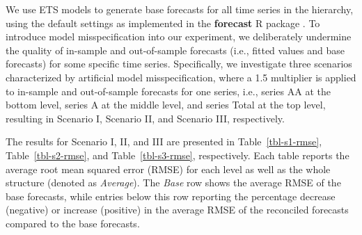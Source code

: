 \documentclass[11pt,a4paper,]{article}
\begin{document}
We use ETS models to generate base forecasts for all time series in the
hierarchy, using the default settings as implemented in the
\textbf{forecast} R package \autocite{Hyndman2023-fc}. To introduce
model misspecification into our experiment, we deliberately undermine
the quality of in-sample and out-of-sample forecasts (i.e., fitted
values and base forecasts) for some specific time series. Specifically,
we investigate three scenarios characterized by artificial model
misspecification, where a 1.5 multiplier is applied to in-sample and
out-of-sample forecasts for one series, i.e., series AA at the bottom
level, series A at the middle level, and series Total at the top level,
resulting in Scenario I, Scenario II, and Scenario III, respectively.

The results for Scenario I, II, and III are presented in
Table~\ref{tbl-s1-rmse}, Table~\ref{tbl-s2-rmse}, and
Table~\ref{tbl-s3-rmse}, respectively. Each table reports the average
root mean squared error (RMSE) for each level as well as the whole
structure (denoted as \emph{Average}). The \emph{Base} row shows the
average RMSE of the base forecasts, while entries below this row
reporting the percentage decrease (negative) or increase (positive) in
the average RMSE of the reconciled forecasts compared to the base
forecasts.
\end{document}
